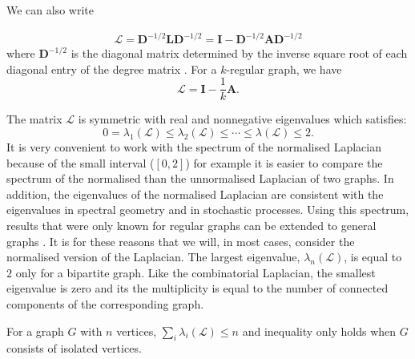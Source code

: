 \documentclass[10pt,a4paper]{article}
\theoremstyle{plain}
\theoremstyle{definition}
\begin{document}
We can also write 

\begin{eqnarray*}
	\mathbf{\mathcal{L}} = \mathbf{D}^{-1/2} \mathbf{L} \mathbf{D}^{-1/2} = \mathbf{I} -\mathbf{D}^{-1/2} \mathbf{A} \mathbf{D}^{-1/2}
\end{eqnarray*}
where $\mathbf{D}^{-1/2}$ is the diagonal matrix determined by the inverse square root of each diagonal entry of the degree matrix \citep{estrada2011structure}. For a $k$-regular graph, we have
\begin{equation}
\mathcal{L} = \mathbf{I}-\frac{1}{k} \mathbf{A}.
\end{equation}

The matrix $\mathcal{L}$ is symmetric with real and nonnegative eigenvalues which satisfies:
\begin{equation*}
0  = \lambda_1(\mathcal{L}) \leq  \lambda_2(\mathcal{L}) \leq \cdots \leq  \lambda(\mathcal{L}) \leq 2.
\end{equation*}
It is very convenient to work with the spectrum of the normalised Laplacian because of the small interval ($[0,2]$) for example it is easier to compare the spectrum of the normalised than the unnormalised Laplacian of two graphs. In addition, the eigenvalues of the normalised Laplacian are consistent with the eigenvalues in spectral geometry and in stochastic processes. Using this spectrum, results that were only known for regular graphs can be extended to general graphs \citep{chung1997spectral}. It is for these reasons that we will, in most cases, consider the normalised version of the Laplacian.
The largest eigenvalue, $\lambda_n(\mathcal{L})$, is equal to $2$ only for a bipartite graph. Like the combinatorial Laplacian, the smallest eigenvalue is zero and its the multiplicity is equal to the number of connected components of the corresponding graph. 

For a graph $G$ with $n$ vertices, $\sum_{i}\lambda_i(\mathcal{L}) \leq n$ and inequality only holds when $G$ consists of isolated vertices.
\end{document}
